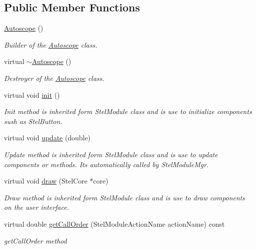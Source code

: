 \subsection*{Public Member Functions}
\begin{DoxyCompactItemize}
\item 
\mbox{\hyperlink{class_autoscope_a70213dc05856f7f6592d089d14f08f68}{Autoscope}} ()
\begin{DoxyCompactList}\small\item\em Builder of the \mbox{\hyperlink{class_autoscope}{Autoscope}} class. \end{DoxyCompactList}\item 
virtual \mbox{\hyperlink{class_autoscope_a8ed25b0eb945f3d2a2a3652322b14b42}{$\sim$\+Autoscope}} ()
\begin{DoxyCompactList}\small\item\em Destroyer of the \mbox{\hyperlink{class_autoscope}{Autoscope}} class. \end{DoxyCompactList}\item 
virtual void \mbox{\hyperlink{class_autoscope_a0aaa7e7edbdd749e209dc42ee360f3a5}{init}} ()
\begin{DoxyCompactList}\small\item\em Init method is inherited form Stel\+Module class and is use to initialize components sush as Stel\+Button. \end{DoxyCompactList}\item 
virtual void \mbox{\hyperlink{class_autoscope_a3def05ed6ebac1d2f0245c96c1719d0a}{update}} (double)
\begin{DoxyCompactList}\small\item\em Update method is inherited form Stel\+Module class and is use to update components or methods. It\textquotesingle{}s automatically called by Stel\+Module\+Mgr. \end{DoxyCompactList}\item 
virtual void \mbox{\hyperlink{class_autoscope_a268e2b524e0abd079f76c55e8443e907}{draw}} (Stel\+Core $\ast$core)
\begin{DoxyCompactList}\small\item\em Draw method is inherited form Stel\+Module class and is use to draw components on the user interface. \end{DoxyCompactList}\item 
virtual double \mbox{\hyperlink{class_autoscope_a9495317b6b710812825c40dbe7ddd458}{get\+Call\+Order}} (Stel\+Module\+Action\+Name action\+Name) const
\begin{DoxyCompactList}\small\item\em get\+Call\+Order method \end{DoxyCompactList}\item 

\end{DoxyCompactItemize}
